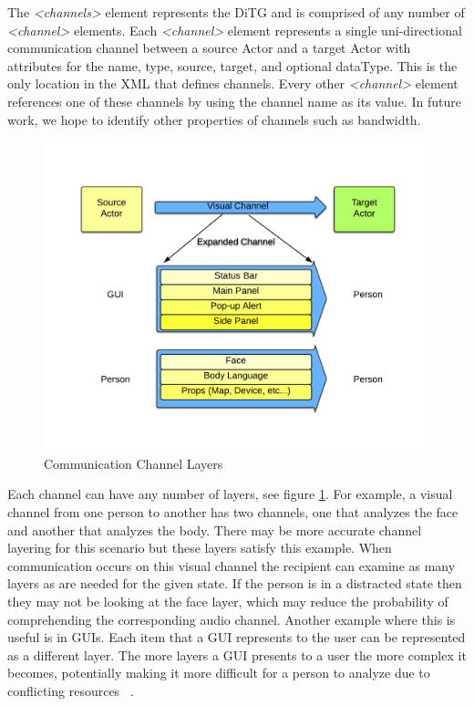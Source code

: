 The {\em \textless channels\textgreater} element represents the DiTG and is comprised of any number of {\em \textless channel\textgreater} elements.  Each {\em \textless channel\textgreater} element represents a single uni-directional communication channel between a source Actor and a target Actor with attributes for the name, type, source, target, and optional dataType.  This is the only location in the XML that defines channels.  Every other {\em \textless channel\textgreater} element references one of these channels by using the channel name as its value.  In future work, we hope to identify other properties of channels such as bandwidth.

\begin{figure}[h]
\begin{center}
\includegraphics[width=6in]{layers.png}
\caption{Communication Channel Layers}
\label{fig:layers}
\end{center}
\end{figure}

Each channel can have any number of layers, see figure \ref{fig:layers}.  For example, a visual channel from one person to another has two channels, one that analyzes the face and another that analyzes the body.  There may be more accurate channel layering for this scenario but these layers satisfy this example.  When communication occurs on this visual channel the recipient can examine as many layers as are needed for the given state.  If the person is in a distracted state then they may not be looking at the face layer, which may reduce the probability of comprehending the corresponding audio channel.  Another example where this is useful is in GUIs.  Each item that a GUI represents to the user can be represented as a different layer.  The more layers a GUI presents to a user the more complex it becomes, potentially making it more difficult for a person to analyze due to conflicting resources ~\cite{salvucci2008threaded}.


